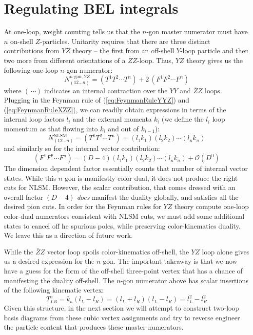 \documentclass[11pt,letter]{article}
\def\eqn#1{(\ref{#1})}
\def\be{\begin{equation}}
\def\ee{\end{equation}}
\begin{document}
\section{Regulating BEL integrals}
At one-loop, weight counting tells us that the $n$-gon master numerator must have $n$ on-shell $Z$-particles. Unitarity requires that there are three distinct contributions from $Y\!Z$ theory -- the first from an off-shell $Y$-loop particle and then two more from different orientations of a $\bar{Z}Z$-loop.  Thus, $Y\!Z$ theory gives us the following one-loop $n$-gon numerator:
\be
N^{n\text{-gon},YZ}_{(12...n)} = (T^{1}T^{2}\cdots T^{n})+2\, (F^1F^2\cdots F^n)
\ee
where $(\,\cdots)$ indicates an internal contraction over the $YY$ and $\bar{Z}Z$ loops. Plugging in the Feynman rule of \eqn{eq:FeynmanRuleYYZ} and \eqn{eq:FeynmanRuleXZZ}, we can readily obtain expressions in terms of the internal loop factors $l_i$ and the external momenta $k_i$ (we define the $l_i$ loop momentum as that flowing into $k_i$ and out of $k_{i-1}$):
\be
N_{(12...n)}^{\text{NLSM}}=(T^{1}T^{2}\cdots T^{n}) = (l_1 k_1)(l_2 k_2) \cdots (l_n k_n)
\ee
and similarly so for the internal vector contribution:
\be
 (F^1F^2\cdots F^n) = (D-4)(l_1 k_1)(l_2 k_2) \cdots (l_n k_n) + \mathcal{O}(D^0)
\ee
The dimension dependent factor essentially counts that number of internal vector states. While this $n$-gon is manifestly color-dual, it does not produce the right cuts for NLSM. However, the scalar contribution, that comes dressed with an overall factor $(D-4)$ \textit{does} manifest the duality globally, and satisfies all the desired pion cuts. In order for the Feynman rules for $Y\!Z$ theory compute one-loop color-dual numerators consistent with NLSM cuts, we must add some additional states to cancel off he spurious poles, while preserving color-kinematics duality. We leave this as a direction of future work. 

While the $\bar{Z}Z$ vector loop spoils color-kinematics off-shell, the $Y\!Z$ loop alone gives us a desired expression for the $n$-gon. The important takeaway is that we now have a guess for the form of the off-shell three-point vertex that has a chance of manifesting the duality off-shell. The $n$-gon numerator above has scalar insertions of the following kinematic vertex:
\be
T^{a}_{LR} = k_a(l_L-l_{R}) = (l_L+l_{R}) (l_L-l_{R})  = l_L^2-l_{R}^2 
\ee
Given this structure, in the next section we will attempt to construct two-loop basis diagrams from these cubic vertex assignments and try to reverse engineer the particle content that produces these master numerators.
\end{document}
